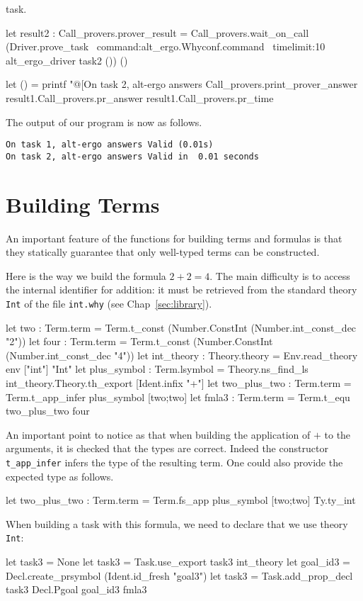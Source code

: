 task.
\begin{ocamlcode}
let result2 : Call_provers.prover_result =
   Call_provers.wait_on_call
    (Driver.prove_task ~command:alt_ergo.Whyconf.command
    ~timelimit:10
    alt_ergo_driver task2 ()) ()

let () =
  printf "@[On task 2, alt-ergo answers %
    Call_provers.print_prover_answer
    result1.Call_provers.pr_answer
    result1.Call_provers.pr_time
\end{ocamlcode}
The output of our program is now as follows.
\begin{verbatim}
On task 1, alt-ergo answers Valid (0.01s)
On task 2, alt-ergo answers Valid in  0.01 seconds
\end{verbatim}

\section{Building Terms}

An important feature of the functions for building terms and formulas
is that they statically guarantee that only well-typed terms can be
constructed.

Here is the way we build the formula $2+2=4$. The main difficulty is to
access the internal identifier for addition: it must be retrieved from
the standard theory \texttt{Int} of the file \texttt{int.why} (see
Chap~\ref{sec:library}).
\begin{ocamlcode}
let two : Term.term =
  Term.t_const (Number.ConstInt (Number.int_const_dec "2"))
let four : Term.term =
  Term.t_const (Number.ConstInt (Number.int_const_dec "4"))
let int_theory : Theory.theory =
  Env.read_theory env ["int"] "Int"
let plus_symbol : Term.lsymbol =
  Theory.ns_find_ls int_theory.Theory.th_export [Ident.infix "+"]
let two_plus_two : Term.term =
  Term.t_app_infer plus_symbol [two;two]
let fmla3 : Term.term = Term.t_equ two_plus_two four
\end{ocamlcode}
An important point to notice as that when building the application of
$+$ to the arguments, it is checked that the types are correct. Indeed
the constructor \texttt{t\_app\_infer} infers the type of the resulting
term. One could also provide the expected type as follows.
\begin{ocamlcode}
let two_plus_two : Term.term =
  Term.fs_app plus_symbol [two;two] Ty.ty_int
\end{ocamlcode}

When building a task with this formula, we need to declare that we use
theory \texttt{Int}:
\begin{ocamlcode}
let task3 = None
let task3 = Task.use_export task3 int_theory
let goal_id3 = Decl.create_prsymbol (Ident.id_fresh "goal3")
let task3 = Task.add_prop_decl task3 Decl.Pgoal goal_id3 fmla3
\end{ocamlcode}

